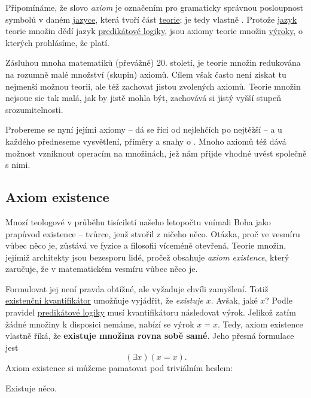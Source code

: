 Připomínáme, že slovo \emph{axiom} je označením pro gramaticky správnou
posloupnost symbolů v daném \hyperref[def:jazyk]{jazyce}, která tvoří část
\hyperref[def:teorie]{teorie}; je tedy vlastně . Protože \hyperref[def:jazyk]{jazyk} teorie množin dědí jazyk
\hyperref[def:predikatova-logika]{predikátové logiky}, jsou axiomy teorie množin
\hyperref[def:vyrok]{výroky}, o kterých prohlásíme, že platí.

Zásluhou mnoha matematiků (převážně) 20. století, je teorie množin redukována na
rozumně malé množství (skupin) axiomů. Cílem však často není získat tu nejmenší
možnou teorii, ale též zachovat jistou  zvolených axiomů.
Teorie množin nejsouc sic tak malá, jak by jistě mohla být, zachovává si jistý
vyšší stupeň srozumitelnosti.

Probereme se nyní jejími axiomy -- dá se říci od nejlehčích po nejtěžší -- a u
každého předneseme vysvětlení, příměry a snahy o . Mnoho axiomů
též dává možnost vzniknout operacím na množinách, jež nám přijde vhodné uvést
společně s nimi.

\subsection{Axiom existence}
\label{ssec:axiom-existence}

Mnozí teologové v průběhu tisíciletí našeho letopočtu vnímali Boha jako prapůvod
existence -- tvůrce, jenž stvořil z ničeho něco. Otázka, proč ve vesmíru vůbec
něco je, zůstává ve fyzice a filosofii víceméně otevřená. Teorie množin, jejímiž
architekty jsou bezesporu lidé, pročež obsahuje \emph{axiom existence}, který
zaručuje, že v matematickém vesmíru vůbec něco je.

Formulovat jej není pravda obtížné, ale vyžaduje chvíli zamyšlení. Totiž
\hyperref[def:existencni-kvantifikator]{existenční kvantifikátor} umožňuje
vyjádřit, že \emph{existuje $x$}. Avšak, jaké $x$? Podle pravidel
\hyperref[def:predikatova-logika]{predikátové logiky} musí kvantifikátoru
následovat výrok. Jelikož zatím žádné množiny k disposici nemáme, nabízí se
výrok $x = x$. Tedy, axiom existence vlastně říká, že \textbf{existuje množina
rovna sobě samé}. Jeho přesná formulace jest
\begin{equation}
  \label{eq:axiom-existence}
  ( \exists x)(x = x).
\end{equation}
Axiom existence si můžeme pamatovat pod triviálním heslem:
\begin{highlightBox}
  \alert{Existuje něco.}
\end{highlightBox}

